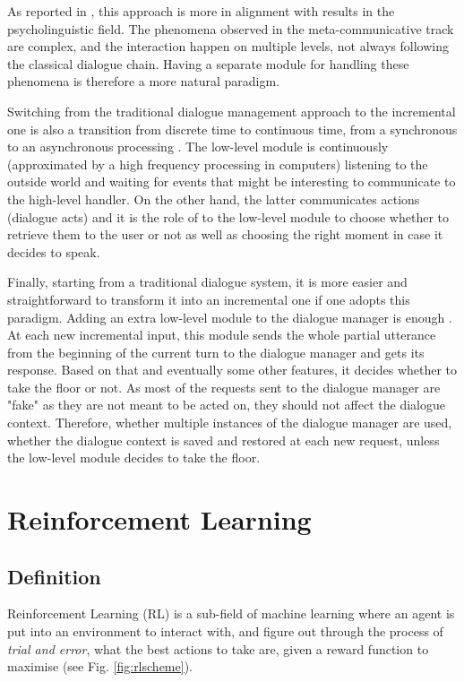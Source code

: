             As reported in \cite{Lemon2003}, this approach is more in alignment with results in the psycholinguistic field. The phenomena observed in the meta-communicative track are complex, and the interaction happen on multiple levels, not always following the classical dialogue chain. Having a separate module for handling these phenomena is therefore a more natural paradigm.
            
            Switching from the traditional dialogue management approach to the incremental one is also a transition from discrete time to continuous time, from a synchronous to an asynchronous processing \cite{Raux2007}. The low-level module is continuously (approximated by a high frequency processing in computers) listening to the outside world and waiting for events that might be interesting to communicate to the high-level handler. On the other hand, the latter communicates actions (dialogue acts) and it is the role of to the low-level module to choose whether to retrieve them to the user or not as well as choosing the right moment in case it decides to speak.
            
            Finally, starting from a traditional dialogue system, it is more easier and straightforward to transform it into an incremental one if one adopts this paradigm. Adding an extra low-level module to the dialogue manager is enough \cite{Selfridge2012a,Khouzaimi2014a}. At each new incremental input, this module sends the whole partial utterance from the beginning of the current turn to the dialogue manager and gets its response. Based on that and eventually some other features, it decides whether to take the floor or not. As most of the requests sent to the dialogue manager are "fake" as they are not meant to be acted on, they should not affect the dialogue context. Therefore, whether multiple instances of the dialogue manager are used, whether the dialogue context is saved and restored at each new request, unless the low-level module decides to take the floor.
    
\section{Reinforcement Learning}
	\subsection{Definition}
    
    	Reinforcement Learning (RL) is a sub-field of machine learning where an agent is put into an environment to interact with, and figure out through the process of \textit{trial and error}, what the best actions to take are, given a reward function to maximise \cite{Sutton1998} (see Fig. \ref{fig:rlscheme}).
        
